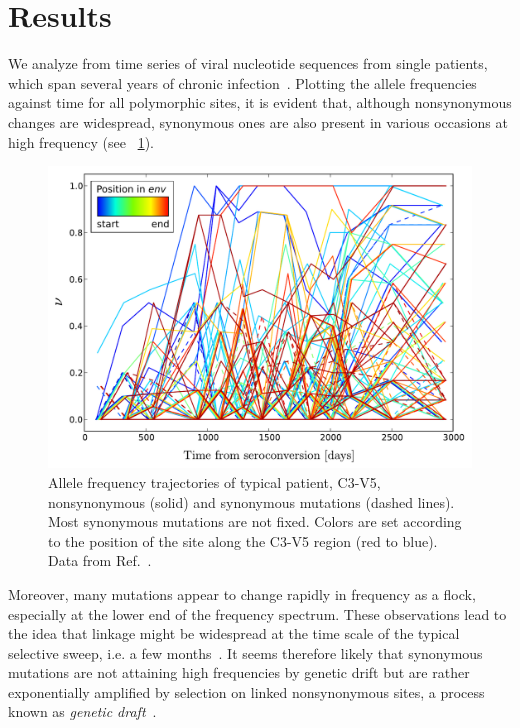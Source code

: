 \documentclass[12pt,a4paper,notitlepage,onecolumn]{article}
\begin{document}
\section{Results}
We analyze from time series of viral nucleotide sequences from single patients,
which span several years of chronic
infection~\citep{shankarappa_consistent_1999, bunnik_autologous_2008,
liu_selection_2006}. Plotting the allele frequencies against time for all
polymorphic sites, it is evident that, although nonsynonymous changes are
widespread, synonymous ones are also present in various occasions at high
frequency (see \figurename~\ref{fig:aft}).
\begin{figure}
\begin{center}
\includegraphics[width=\linewidth]{Shankarappa_allele_freqs_trajectories_syn_nonsynp8}
\caption{Allele frequency trajectories of typical patient, C3-V5, nonsynonymous
(solid) and synonymous mutations (dashed lines). Most synonymous mutations are
not fixed. Colors are set according to the position of the site along the C3-V5
region (red to blue). Data from Ref.~\cite{shankarappa_consistent_1999}.}
\label{fig:aft}
\end{center}
\end{figure}
Moreover, many mutations appear to change rapidly in frequency as a flock,
especially at the lower end of the frequency spectrum. These observations lead
to the idea that linkage might be widespread at the time scale of the typical
selective sweep, i.e. a few months~\citep{neher_recombination_2010}. It seems
therefore likely that synonymous mutations are not attaining high frequencies by
genetic drift but are rather exponentially amplified by selection on linked
nonsynonymous sites, a process known as {\it genetic
draft}~\citep{neher_genetic_2011}.
\end{document}

